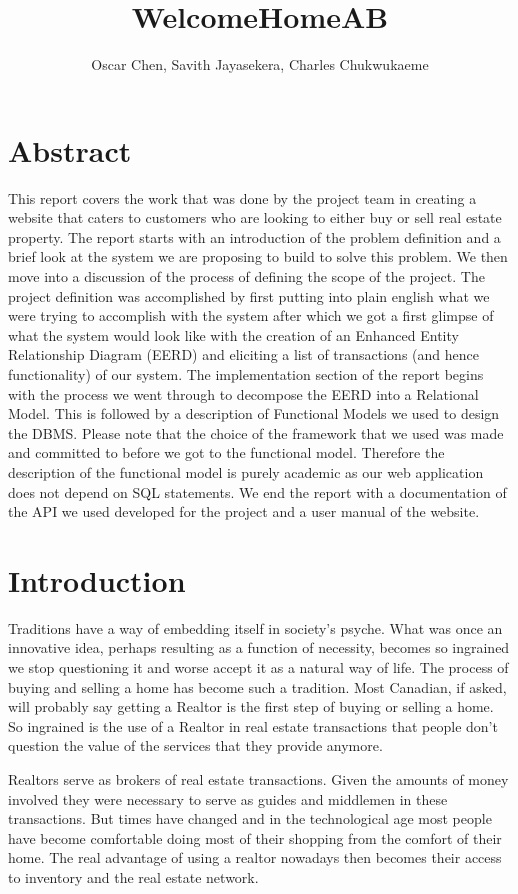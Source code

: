 \documentclass[12pt,a4paper]{report}
\author{Oscar Chen, Savith Jayasekera, Charles Chukwukaeme}
\title{WelcomeHomeAB}
\begin{document}
\maketitle
\tableofcontents
\newpage
\section{Abstract}
This report covers the work that was done by the project team in creating a website that caters to customers who are looking to either buy or sell real estate property. The report starts with an introduction of the problem definition and a brief look at the system we are proposing to build to solve this problem. We then move into a discussion of the process of defining the scope of the project. The project definition was accomplished by first putting into plain english what we were trying to accomplish with the system after which we got a first glimpse of what the system would look like with the creation of an Enhanced Entity Relationship Diagram (EERD) and eliciting a list of transactions (and hence functionality) of our system. The implementation section of the report begins with the process we went through to decompose the EERD into a Relational Model. This is followed by a description of Functional Models we used to design the DBMS. Please note that the choice of the framework that we used was made and committed to before we got to the functional model. Therefore the description of the functional model is purely academic as our web application does not depend on SQL statements. We end the report with a documentation of the API we used developed for the project and a user manual of the website. 

\section{Introduction}

Traditions have a way of embedding itself in society's psyche. What was once an innovative idea, perhaps resulting as a function of necessity, becomes so ingrained we stop questioning it and worse accept it as a natural way of life. The process of buying and selling a home has become such a tradition. Most Canadian, if asked, will probably say getting a Realtor is the first step of buying or selling a home. So ingrained is the use of a Realtor in real estate transactions that people don't question the value of the services that they provide anymore.

Realtors serve as brokers of real estate transactions. Given the amounts of money involved they were necessary to serve as guides and middlemen in these transactions. But times have changed and in the technological age most people have become comfortable doing most of their shopping from the comfort of their home. The real advantage of using a realtor nowadays then becomes their access to inventory and the real estate network.
\end{document}
